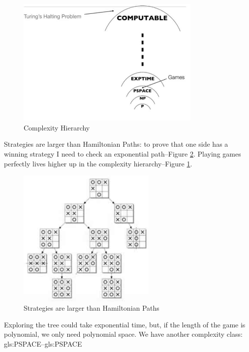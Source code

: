 \documentclass[]{article}
\begin{document}
\begin{figure}[H]
	\caption{Complexity Hierarchy}\label{fig:complexity:hierarchy}
	\includegraphics[width=0.8\textwidth]{hierarchy}
\end{figure}

Strategies are larger than Hamiltonian Paths: to prove that one side has a winning strategy I need to check an exponential path--Figure \ref{fig:PSPACE}. Playing games perfectly lives higher up in the complexity hierarchy--Figure \ref{fig:complexity:hierarchy}. 
\begin{figure}[H]
	\begin{center}
		\caption{Strategies are larger than Hamiltonian Paths}\label{fig:PSPACE}
		\includegraphics[width=0.6\textwidth]{PSPACE}
	\end{center}
\end{figure}

Exploring the tree could take exponential time, but, if the length of the game is polynomial, we only need polynomial space. We have another complexity class: \gls{gls:PSPACE}--\glsdesc{gls:PSPACE}
\end{document}
